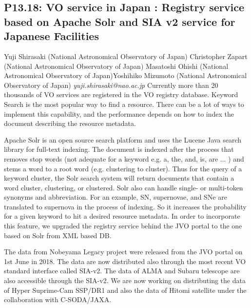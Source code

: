 \documentclass{report}
\begin{document}
\subsection*{P13.18: VO service in Japan : Registry service based on Apache Solr and SIA v2 service for Japanese Facilities}
\bigskip
Yuji Shirasaki (National Astronomical Observatory of Japan) \newline Christopher Zapart (National Astronomical Observatory of Japan) \newline  Masatoshi Ohishi (National Astronomical Observatory of Japan)\newline  Yoshihiko Mizumoto (National Astronomical Observatory of Japan)\newline  \newline  \newline\newline
{\it yuji.shirasaki@nao.ac.jp}\newline
\newline\newline
Currently more than 20 thousands of VO services are registered in the
VO registry database.
Keyword Search is the most popular way to find a resource.
There can be a lot of ways to implement this capability, and the performance
depends on how to index the document describing the resource metadata.

Apache Solr is an open source search platform and uses the Lucene Java
search library for full-text indexing.
The document is indexed after the process that removes stop words
(not adequate for a keyword e.g. a, the, and, is, are ... ) and stems
a word to a root word (e.g. clustering to cluster).
Thus for the query of a keyword cluster, the Solr search system will
return documents that contain a word cluster, clustering, or clustered.
Solr also can handle single- or multi-token synonyms and abbreviation.
For an example, SN, supernovae, and SNe are translated to supernova
in the process of indexing.
So it increases the probability for a given keyword to hit a desired
resource metadata.
In order to incorporate this feature, we upgraded the registry service
behind the JVO portal to the one based on Solr from XML based DB.

The data from Nobeyama Legacy project were released from the JVO portal
on 1st June in 2018.
The data are now distributed also through the most recent VO standard interface
called SIA-v2.
The data of ALMA and Subaru telescope are also accessible through the SIA-v2.
We are now working on distributing the data of Hyper Suprime-Cam SSP/DR1 and 
also the data of Hitomi satellite under the collaboration with C-SODA/JAXA.
\end{document}
